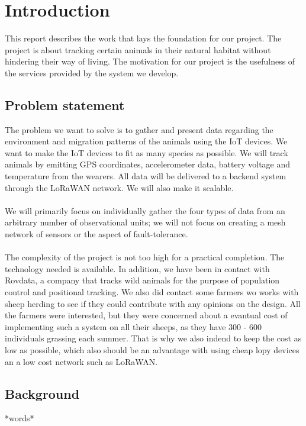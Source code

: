 \tableofcontents
\listoffigures

\clearpage

\section{Introduction}
	This report describes the work that lays the foundation for our project. The project is about tracking certain animals in their natural habitat without hindering their way of living. The motivation for our project is the usefulness of the services provided by the system we develop. 
	\subsection{Problem statement}
		The problem we want to solve is to gather and present data regarding the environment and migration patterns of the animals using the IoT devices. We want to make the IoT devices to fit as many species as possible. We will track animals by emitting GPS coordinates, accelerometer data, battery voltage and temperature from the wearers. All data will be delivered to a backend system through the LoRaWAN network. We will also make it scalable. 
		\\\\
		We will primarily focus on individually gather the four types of data from an arbitrary number of observational units; we will not focus on creating a mesh network of sensors or the aspect of fault-tolerance. 
		\\\\
		The complexity of the project is not too high for a practical completion. The technology needed is available. In addition, we have been in contact with Rovdata, a company that tracks wild animals for the purpose of population control and positional tracking. We also did contact some farmers wo works with sheep herding to see if they could contribute with any opinions on the design. All the farmers were interested, but they were concerned about a evantual cost of implementing such a system on all their sheeps, as they have 300 - 600 individuals grassing each summer. That is why we also indend to keep the cost as low as possible, which also should be an advantage with using cheap lopy devices an a low cost network such as LoRaWAN. 
	\subsection{Background}
		*words*
		
